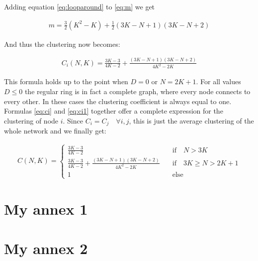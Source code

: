 \begin{apendicesenv}
Adding equation \ref{eq:looparound} to \ref{eq:m} we get

\begin{align}
    m = \frac{3}{2}(K^2 - K) + \frac{1}{2}(3K-N+1)(3K-N+2)
\end{align}

And thus the clustering now becomes:

\begin{align}
    C_i(N,K) = \frac{3K-3}{4K-2} + \frac{(3K-N+1)(3K-N+2)}{4K^2-2K}
    \label{eq:ci1}
\end{align}

This formula holds up to the point when $D=0$ or $N=2K+1$. For all values $D\leq 0$ the regular ring is in fact a complete graph, where
every node connects to every other. In these cases the clustering coefficient is always equal to one.  Formulas \ref{eq:ci} and
\ref{eq:ci1} together offer a complete expression for the clustering of node $i$. Since $C_i=C_j \quad \forall i,j$, this is just the
average clustering of the whole network and we finally get:

\begin{align}
    C(N,K) =
    \begin{cases}
        \frac{3K-3}{4K-2} \quad &\text{if} \quad N>3K \\[9pt]
        \frac{3K-3}{4K-2} + \frac{(3K-N+1)(3K-N+2)}{4K^2-2K} \quad &\text{if}
        \quad 3K \geq N > 2K+1 \\[9pt]
        1 \quad &\text{else}
    \end{cases}
    \label{eq:ci2}
\end{align}


\end{apendicesenv}


\begin{anexosenv}


\partanexos  %

\chapter{My annex 1}
\chapter{My annex 2}


\end{anexosenv}

